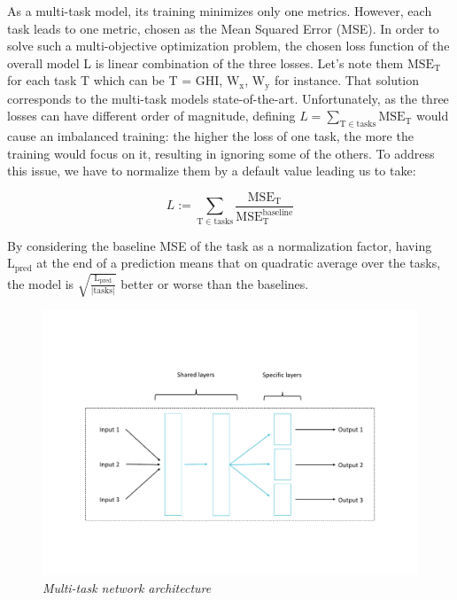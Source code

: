 \documentclass{article}
\newcommand{\saut}{\vspace{10px}}
\begin{document}
\saut

As a multi-task model, its training minimizes only one metrics. However, each task leads to one metric, chosen as
the Mean Squared Error (MSE). In order to solve such a multi-objective optimization problem, the chosen loss
function of the overall model L is linear combination of the three losses. Let's note them
$\mathrm{MSE}_{\mathrm T}$
for each task T which can be T = GHI, $\mathrm W_{\mathrm x}$, $\mathrm W_{\mathrm y}$ for instance.
That solution corresponds to the multi-task models state-of-the-art.
Unfortunately, as the three losses can have different order of magnitude, defining
$L = \sum_{\mathrm T \in \mathrm{tasks}} \mathrm{MSE}_{\mathrm T}$ would cause an imbalanced training: the
higher the loss of one task, the more the training would focus on it, resulting in ignoring some of the others. To address
this issue, we have to normalize them by a default value leading us to take:

\[
	L := \sum_{\mathrm T \in \mathrm{tasks}}
	\frac{\mathrm{MSE}_{\mathrm T}}{\mathrm{MSE}^{\mathrm{baseline}}_{\mathrm T}}
\]

By considering the baseline MSE of the task as a normalization factor, having $\mathrm L_{\mathrm{pred}}$ at
the end of a prediction means that on quadratic average over the tasks, the model is
$\sqrt{\frac{\mathrm L_{\mathrm{pred}}}{| \mathrm{tasks} | }}$ better or worse than the baselines.

\vspace{-40px}

\begin{figure}[H]
    \centering
    \includegraphics[width=.9\linewidth]{img/heads.pdf}
    \vspace{-30px}
    \caption{\textit{Multi-task network architecture}}
    \label{fig:Fig. 2}
\end{figure}
\end{document}
